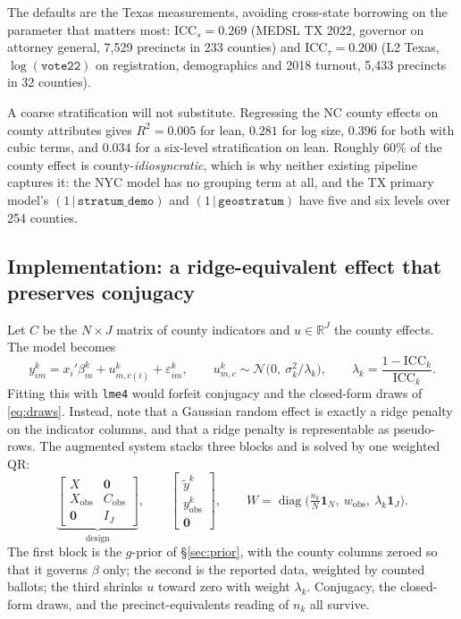 \documentclass[11pt]{article}
\newcommand{\Norm}{\mathcal{N}}
\begin{document}
The defaults are the Texas measurements, avoiding cross-state borrowing on the parameter
that matters most: $\text{ICC}_s = 0.269$ (MEDSL TX 2022, governor on attorney general,
7{,}529 precincts in 233 counties) and $\text{ICC}_\tau = 0.200$ (L2 Texas,
$\log(\texttt{vote22})$ on registration, demographics and 2018 turnout, 5{,}433 precincts
in 32 counties).

A coarse stratification will not substitute. Regressing the NC county effects on county
attributes gives $R^2 = 0.005$ for lean, $0.281$ for log size, $0.396$ for both with cubic
terms, and $0.034$ for a six-level stratification on lean. Roughly $60\%$ of the county
effect is county-\emph{idiosyncratic}, which is why neither existing pipeline captures it:
the NYC model has no grouping term at all, and the TX primary model's
$(1\,|\,\texttt{stratum\_demo})$ and $(1\,|\,\texttt{geostratum})$ have five and six levels
over 254 counties.

\subsection{Implementation: a ridge-equivalent effect that preserves conjugacy}

Let $C$ be the $N \times J$ matrix of county indicators and $u \in \mathbb{R}^J$ the county
effects. The model becomes
\begin{equation}
  y^{k}_{im} = x_i'\beta^{k}_{m} + u^{k}_{m,c(i)} + \varepsilon^{k}_{im},
  \qquad u^{k}_{m,c} \sim \Norm\big(0,\ \sigma_k^2/\lambda_k\big),
  \qquad \lambda_k = \frac{1 - \text{ICC}_k}{\text{ICC}_k}.
  \label{eq:cre}
\end{equation}
Fitting this with \texttt{lme4} would forfeit conjugacy and the closed-form draws of
\eqref{eq:draws}. Instead, note that a Gaussian random effect is exactly a ridge penalty
on the indicator columns, and that a ridge penalty is representable as pseudo-rows. The
augmented system stacks three blocks and is solved by one weighted QR:
\begin{equation}
  \underbrace{\begin{bmatrix} X & \mathbf{0} \\ X_{\textrm{obs}} & C_{\textrm{obs}} \\
  \mathbf{0} & I_J \end{bmatrix}}_{\textrm{design}},
  \qquad
  \begin{bmatrix} \tilde y^{k} \\ y^{k}_{\textrm{obs}} \\ \mathbf{0}\end{bmatrix},
  \qquad
  W = \operatorname{diag}\big(\tfrac{n_k}{N}\mathbf 1_N,\ w_{\textrm{obs}},\ \lambda_k \mathbf 1_J\big).
  \label{eq:creaug}
\end{equation}
The first block is the $g$-prior of \S\ref{sec:prior}, with the county columns zeroed so
that it governs $\beta$ only; the second is the reported data, weighted by counted ballots;
the third shrinks $u$ toward zero with weight $\lambda_k$. Conjugacy, the closed-form
draws, and the precinct-equivalents reading of $n_k$ all survive.
\end{document}
